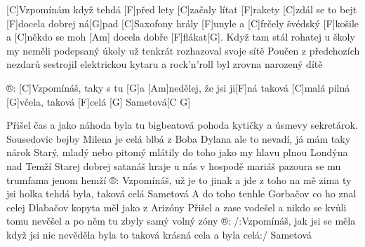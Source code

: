 
[C]Vzpomínám když tehdá [F]před lety [C]začaly lítat [F]rakety  
[C]zdál se to bejt [F]docela dobrej ná[G]pad
[C]Saxofony hrály [F]unyle a [C]frčely švédský [F]košile
a [C]někdo se moh [Am] docela dobře [F]flákat[G]. 
Když tam stál rohatej u školy my neměli podepsaný úkoly
už tenkrát rozhazoval svoje sítě
Poučen z předchozích nezdarů sestrojil elektrickou kytaru
a rock'n'roll byl zrovna narozený dítě

®: [C]Vzpomínáš, taky s tu [G] a [Am]nedělej, že jsi ji[F]ná
taková [C]malá pilná [G]včela, taková [F]celá [G] Sametová[C G]

Přišel čas a jako náhoda byla tu bigbeatová pohoda
kytičky a úsmevy sekretárok.
Sousedovic bejby Milena je celá blbá z Boba Dylana
ale to nevadí, já mám taky nárok
Starý, mladý nebo pitomý mlátily do toho jako my
hlavu plnou Londýna nad Temží
Starej dobrej satanáš hraje u nás v hospodě mariáš
pazoura se mu trumfama jenom hemží
®: Vzpomínáš, už je to jinak a jde z toho na mě zima
ty jsi holka tehdá byla, taková celá Sametová
A do toho tenhle Gorbačov co ho znal celej Dlabačov
kopyta měl jako z Arizóny
Přišel a zase vodešel a nikdo se kvůli tomu nevěšel
a po něm tu zbyly samý volný zóny
®: /:Vzpomínáš, jak jsi se měla když jsi nic nevěděla
byla to taková krásná cela a byla celá:/  Sametová
